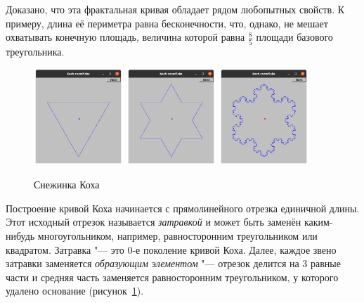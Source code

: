 Доказано, что эта фрактальная кривая обладает рядом любопытных свойств. К примеру, длина её периметра равна бесконечности, что, однако, не мешает охватывать конечную площадь, величина которой равна \(\frac{8}{5}\) площади базового треугольника.

\begin{figure}[ht]
    {\centering
        \includegraphics[width=0.3\textwidth]{images/koch_snowflake_n=0.png}\hfil
        \includegraphics[width=0.3\textwidth]{images/koch_snowflake_n=1.png}\hfil
        \includegraphics[width=0.3\textwidth]{images/koch_snowflake_n=5.png}

    }
    \caption{Снежинка Коха}
    \label{fig:kochshowflake}
\end{figure}

Построение кривой Коха начинается с прямолинейного отрезка единичной длины. Этот исходный отрезок называется \emph{затравкой} и может быть заменён каким-нибудь многоугольником, например, равносторонним треугольником или квадратом. Затравка "--- это \(0\)-е поколение кривой Коха. Далее, каждое звено затравки заменяется \emph{образующим элементом} "--- отрезок делится на 3 равные части и средняя часть заменяется равносторонним треугольником, у которого удалено основание (рисунок~\ref{fig:kochshowflake}).

